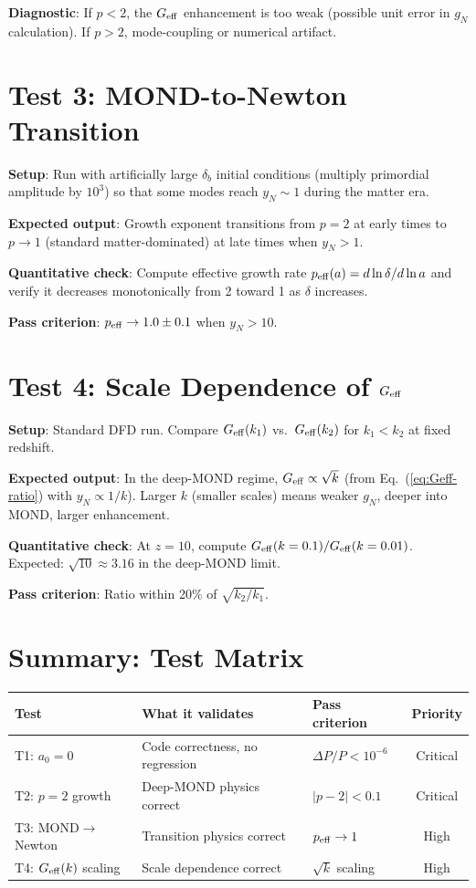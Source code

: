 \documentclass[11pt]{article}
\theoremstyle{definition}
\theoremstyle{remark}
\newcommand{\Geff}{G_{\rm eff}}
\begin{document}
\textbf{Diagnostic}: If $p < 2$, the $\Geff$ enhancement is too weak
(possible unit error in $g_N$ calculation). If $p > 2$, mode-coupling
or numerical artifact.


\section{Test 3: MOND-to-Newton Transition}

\textbf{Setup}: Run with artificially large $\delta_b$ initial conditions
(multiply primordial amplitude by $10^3$) so that some modes reach
$y_N \sim 1$ during the matter era.

\textbf{Expected output}: Growth exponent transitions from $p = 2$ at
early times to $p \to 1$ (standard matter-dominated) at late times when
$y_N > 1$.

\textbf{Quantitative check}: Compute effective growth rate
$p_{\rm eff}(a) = d\ln\delta/d\ln a$ and verify it decreases monotonically
from 2 toward 1 as $\delta$ increases.

\textbf{Pass criterion}: $p_{\rm eff} \to 1.0 \pm 0.1$ when $y_N > 10$.


\section{Test 4: Scale Dependence of $\Geff$}

\textbf{Setup}: Standard DFD run. Compare $\Geff(k_1)$ vs.\ $\Geff(k_2)$
for $k_1 < k_2$ at fixed redshift.

\textbf{Expected output}: In the deep-MOND regime,
$\Geff \propto \sqrt{k}$ (from Eq.~(\ref{eq:Geff-ratio}) with
$y_N \propto 1/k$). Larger $k$ (smaller scales) means weaker $g_N$,
deeper into MOND, larger enhancement.

\textbf{Quantitative check}: At $z = 10$, compute
$\Geff(k = 0.1)/\Geff(k = 0.01)$. Expected: $\sqrt{10} \approx 3.16$
in the deep-MOND limit.

\textbf{Pass criterion}: Ratio within 20\% of $\sqrt{k_2/k_1}$.


\section{Summary: Test Matrix}

\begin{center}
\begin{tabular}{lllc}
\toprule
Test & What it validates & Pass criterion & Priority \\
\midrule
T1: $a_0 = 0$ & Code correctness, no regression & $\Delta P/P < 10^{-6}$ & Critical \\
T2: $p = 2$ growth & Deep-MOND physics correct & $|p-2| < 0.1$ & Critical \\
T3: MOND$\to$Newton & Transition physics correct & $p_{\rm eff} \to 1$ & High \\
T4: $\Geff(k)$ scaling & Scale dependence correct & $\sqrt{k}$ scaling & High \\
\bottomrule
\end{tabular}
\end{center}
\end{document}
